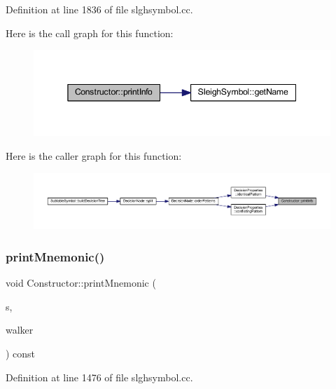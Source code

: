 Definition at line 1836 of file slghsymbol.\+cc.

Here is the call graph for this function\+:
\nopagebreak
\begin{figure}[H]
\begin{center}
\leavevmode
\includegraphics[width=345pt]{class_constructor_a2a0182b33c360d0d987a2ce62a5c8abe_cgraph}
\end{center}
\end{figure}
Here is the caller graph for this function\+:
\nopagebreak
\begin{figure}[H]
\begin{center}
\leavevmode
\includegraphics[width=350pt]{class_constructor_a2a0182b33c360d0d987a2ce62a5c8abe_icgraph}
\end{center}
\end{figure}
\mbox{\label{class_constructor_a17546bf5169b175426f056051d491ecd}} 
\subsubsection{\texorpdfstring{printMnemonic()}{printMnemonic()}}
{\footnotesize\ttfamily void Constructor\+::print\+Mnemonic (\begin{DoxyParamCaption}\item[{ostream \&}]{s,  }\item[{\mbox{\hyperlink{class_parser_walker}{Parser\+Walker}} \&}]{walker }\end{DoxyParamCaption}) const}



Definition at line 1476 of file slghsymbol.\+cc.

